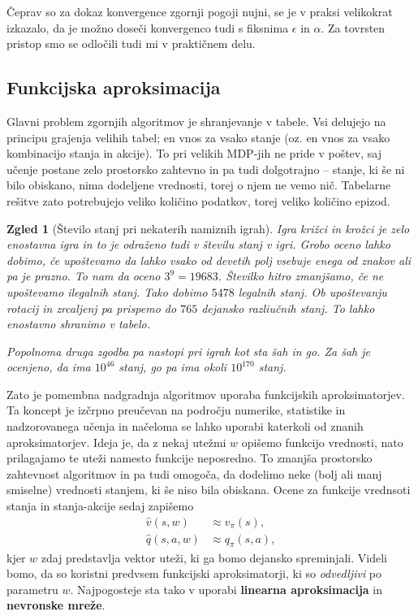 \documentclass[12pt,a4paper]{amsart}
\theoremstyle{definition} %
\theoremstyle{plain} %
\newtheorem{zgled}[definicija]{Zgled}
\begin{document}
Čeprav so za dokaz konvergence zgornji pogoji nujni, se je v praksi velikokrat izkazalo, da je možno 
doseči konvergenco tudi s fiksnima $\epsilon$ in $\alpha$. Za tovrsten pristop smo se odločili tudi 
mi v praktičnem delu.

\subsection{Funkcijska aproksimacija}
Glavni problem zgornjih algoritmov je shranjevanje v tabele. Vsi delujejo na principu grajenja 
velihih tabel; en vnos za vsako stanje (oz. en vnos za vsako kombinacijo stanja in akcije). To pri 
velikih MDP-jih ne pride v poštev, saj učenje postane zelo prostorsko zahtevno in pa tudi 
dolgotrajno -- stanje, ki še ni bilo obiskano, nima dodeljene vrednosti, torej o njem ne vemo nič. 
Tabelarne rešitve zato potrebujejo veliko količino podatkov, torej veliko količino epizod.  

\begin{zgled}[Število stanj pri nekaterih namiznih igrah]
    Igra križci in krožci je zelo enostavna igra in to je odraženo tudi v številu stanj v igri. 
    Grobo oceno lahko dobimo, če upoštevamo da lahko vsako od devetih polj vsebuje enega od znakov 
    ali pa je prazno. To nam da oceno $3^9 = 19683$. Številko hitro zmanjšamo, če ne upoštevamo 
    ilegalnih stanj. Tako dobimo $5478$ legalnih stanj. Ob upoštevanju rotacij in zrcaljenj pa 
    prispemo do $765$ dejansko razliučnih stanj. To lahko enostavno shranimo v tabelo. 

    Popolnoma druga zgodba pa nastopi pri igrah kot sta šah in go. Za šah je ocenjeno, da ima 
    $10^{46}$ stanj, go pa ima okoli $10^{170}$ stanj.
\end{zgled}

Zato je pomembna nadgradnja algoritmov uporaba funkcijskih aproksimatorjev. Ta koncept je izčrpno 
preučevan na področju numerike, statistike in nadzorovanega učenja in načeloma se lahko uporabi 
katerkoli od znanih aproksimatorjev. Ideja je, da z nekaj utežmi $w$ opišemo funkcijo vrednosti, nato
prilagajamo te uteži namesto funkcije neposredno. To zmanjša prostorsko zahtevnost algoritmov 
in pa tudi omogoča, da dodelimo neke (bolj ali manj smiselne) vrednosti stanjem, ki še niso bila 
obiskana. Ocene za funkcije vrednsoti stanja in stanja-akcije sedaj zapišemo
\begin{align*}
    \hat{v}(s, w) &\approx v_\pi(s), \\
    \hat{q}(s, a, w) &\approx q_\pi(s, a), 
\end{align*}
kjer $w$ zdaj predstavlja vektor uteži, ki ga bomo dejansko spreminjali. Videli bomo, da so koristni
predvsem funkcijski aproksimatorji, ki so \textit{odvedljivi} po parametru $w$. Najpogosteje sta tako v 
uporabi \textbf{linearna aproksimacija} in \textbf{nevronske mreže}. 
\end{document}
